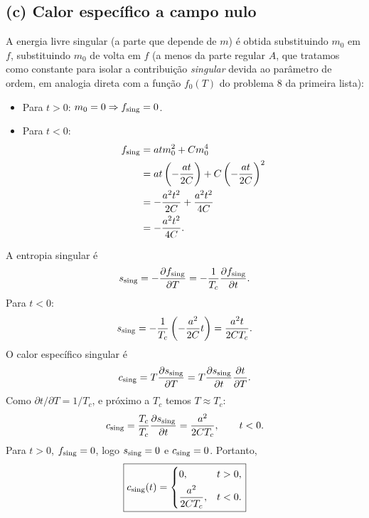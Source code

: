 \documentclass[11pt,a4paper]{article}
\begin{document}
\subsection*{(c) Calor específico a campo nulo}
%
A energia livre singular (a parte que depende de $m$) é obtida substituindo $m_0$ em $f$, substituindo $m_0$ de volta em $f$ (a menos da parte regular $A$, que tratamos como constante para isolar a contribuição \emph{singular} devida ao parâmetro de ordem, em analogia direta com a função $f_0(T)$ do problema 8 da primeira lista):
%
\begin{itemize}
    \item Para $t > 0$: $m_0 = 0 \Rightarrow f_{\rm sing} = 0$.
    \item Para $t < 0$:
    \begin{align}
        f_{\rm sing} &= a t m_0^2 + C m_0^4 \\
        &= a t \left( -\frac{a t}{2C} \right) + C \left( -\frac{a t}{2C} \right)^2 \\
        &= -\frac{a^2 t^2}{2C} + \frac{a^2 t^2}{4C} \\
        &= -\frac{a^2 t^2}{4C}.
    \end{align}
\end{itemize}
%
A entropia singular é
%
\begin{equation}
    s_{\rm sing} = -\frac{\partial f_{\rm sing}}{\partial T} = -\frac{1}{T_c} \frac{\partial f_{\rm sing}}{\partial t}.
\end{equation}
%
Para $t < 0$:
%
\begin{equation}
    s_{\rm sing} = -\frac{1}{T_c} \left( -\frac{a^2}{2C} t \right) = \frac{a^2 t}{2C T_c}.
\end{equation}
%
O calor específico singular é
%
\begin{equation}
    c_{\rm sing} = T \frac{\partial s_{\rm sing}}{\partial T} = T \frac{\partial s_{\rm sing}}{\partial t} \frac{\partial t}{\partial T}.
\end{equation}
%
Como $\partial t/\partial T = 1/T_c$, e próximo a $T_c$ temos $T \approx T_c$:
%
\begin{equation}
    c_{\rm sing} = \frac{T_c}{T_c} \frac{\partial s_{\rm sing}}{\partial t} = \frac{a^2}{2C T_c}, \qquad t < 0.
\end{equation}
%
Para $t > 0$, $f_{\rm sing} = 0$, logo $s_{\rm sing} = 0$ e $c_{\rm sing} = 0$. Portanto,
%
\begin{equation}
    \boxed{
    c_{\rm sing}(t) =
    \begin{cases}
        0, & t > 0, \\[4pt]
        \dfrac{a^2}{2C T_c}, & t < 0.
    \end{cases}
    }
\end{equation}
\end{document}
